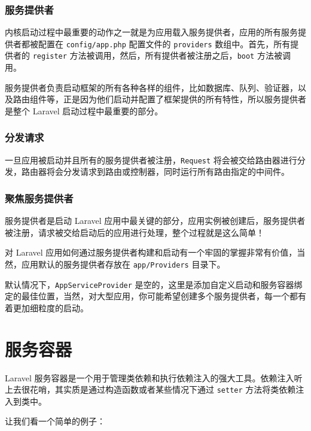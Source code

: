 \documentclass{progartcn}
\begin{document}
\subsubsection{服务提供者}

内核启动过程中最重要的动作之一就是为应用载入服务提供者，应用的所有服务提供者都被配置在 \verb|config/app.php| 配置文件的 \verb|providers| 数组中。首先，所有提供者的 \verb|register| 方法被调用，然后，所有提供者被注册之后，\verb|boot| 方法被调用。

服务提供者负责启动框架的所有各种各样的组件，比如数据库、队列、验证器，以及路由组件等，正是因为他们启动并配置了框架提供的所有特性，所以服务提供者是整个 Laravel 启动过程中最重要的部分。

\subsubsection{分发请求}

一旦应用被启动并且所有的服务提供者被注册，\verb|Request| 将会被交给路由器进行分发，路由器将会分发请求到路由或控制器，同时运行所有路由指定的中间件。

\subsubsection{聚焦服务提供者}

服务提供者是启动 Laravel 应用中最关键的部分，应用实例被创建后，服务提供者被注册，请求被交给启动后的应用进行处理，整个过程就是这么简单！

对 Laravel 应用如何通过服务提供者构建和启动有一个牢固的掌握非常有价值，当然，应用默认的服务提供者存放在 \verb|app/Providers| 目录下。

默认情况下，\verb|AppServiceProvider| 是空的，这里是添加自定义启动和服务容器绑定的最佳位置，当然，对大型应用，你可能希望创建多个服务提供者，每一个都有着更加细粒度的启动。

\section{服务容器}

Laravel 服务容器是一个用于管理类依赖和执行依赖注入的强大工具。依赖注入听上去很花哨，其实质是通过构造函数或者某些情况下通过 \verb|setter| 方法将类依赖注入到类中。

让我们看一个简单的例子：
\end{document}
